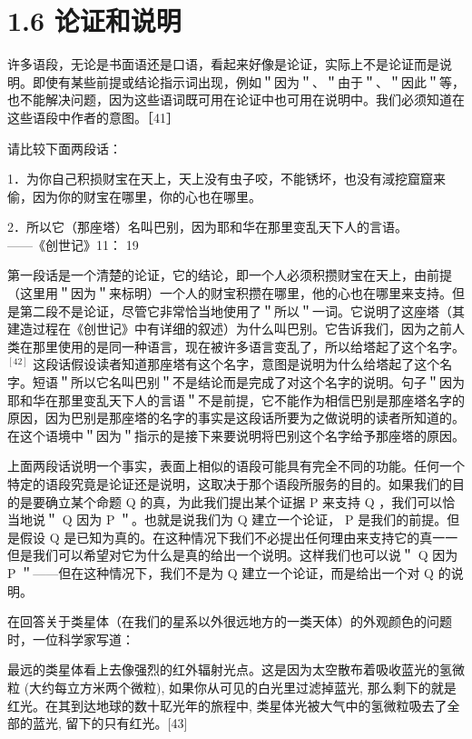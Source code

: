 \section*{1.6 论证和说明}
许多语段，无论是书面语还是口语，看起来好像是论证，实际上不是论证而是说明。即使有某些前提或结论指示词出现，例如＂因为＂、＂由于＂、＂因此＂等，也不能解决问题，因为这些语词既可用在论证中也可用在说明中。我们必须知道在这些语段中作者的意图。［41］

请比较下面两段话：

1．为你自己积损财宝在天上，天上没有虫子咬，不能锈坏，也没有淢挖窟窟来偷，因为你的财宝在哪里，你的心也在哪里。

2．所以它（那座塔）名叫巴别，因为耶和华在那里变乱天下人的言语。\\
——《创世记》11： 19

第一段话是一个清楚的论证，它的结论，即一个人必须积攒财宝在天上，由前提（这里用＂因为＂来标明）一个人的财宝积攒在哪里，他的心也在哪里来支持。但是第二段不是论证，尽管它非常恰当地使用了＂所以＂一词。它说明了这座塔（其建造过程在《创世记》中有详细的叙述）为什么叫巴别。它告诉我们，因为之前人类在那里使用的是同一种语言，现在被许多语言变乱了，所以给塔起了这个名字。 ${}^{[42]}$ 这段话假设读者知道那座塔有这个名字，意图是说明为什么给塔起了这个名字。短语＂所以它名叫巴别＂不是结论而是完成了对这个名字的说明。句子＂因为耶和华在那里变乱天下人的言语＂不是前提，它不能作为相信巴别是那座塔名字的原因，因为巴别是那座塔的名字的事实是这段话所要为之做说明的读者所知道的。在这个语境中＂因为＂指示的是接下来要说明将巴别这个名字给予那座塔的原因。

上面两段话说明一个事实，表面上相似的语段可能具有完全不同的功能。任何一个特定的语段究竟是论证还是说明，这取决于那个语段所服务的目的。如果我们的目的是要确立某个命题 Q 的真，为此我们提出某个证据 P 来支持 Q ，我们可以恰当地说＂ Q 因为 P ＂。也就是说我们为 Q 建立一个论证， P 是我们的前提。但是假设 Q 是已知为真的。在这种情况下我们不必提出任何理由来支持它的真一一但是我们可以希望对它为什么是真的给出一个说明。这样我们也可以说＂ Q 因为 P ＂——但在这种情况下，我们不是为 Q 建立一个论证，而是给出一个对 Q 的说明。

在回答关于类星体（在我们的星系以外很远地方的一类天体）的外观颜色的问题时，一位科学家写道：

\begin{displayquote}
最远的类星体看上去像强烈的红外辐射光点。这是因为太空散布着吸收蓝光的氢微粒 (大约每立方米两个微粒), 如果你从可见的白光里过滤掉蓝光, 那么剩下的就是红光。在其到达地球的数十䎲光年的旅程中, 类星体光被大气中的氢微粒吸去了全部的蓝光, 留下的只有红光。[43]
\end{displayquote}

